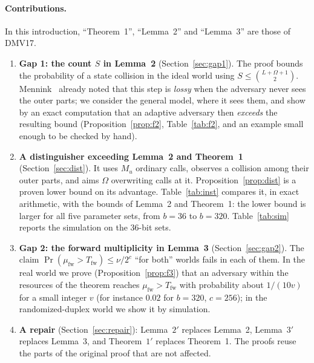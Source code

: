 \documentclass[11pt,a4paper]{article}
\theoremstyle{definition}
\theoremstyle{remark}
\newcommand{\mufw}{\mu_{\mathrm{fw}}}
\newcommand{\Tfw}{T_{\mathrm{fw}}}
\begin{document}
\paragraph{Contributions.}
In this introduction, ``Theorem~1'', ``Lemma~2'' and ``Lemma~3'' are those of DMV17.
\begin{enumerate}[leftmargin=*,itemsep=2pt]
\item \textbf{Gap 1: the count $S$ in Lemma~2} (Section~\ref{sec:gap1}). The proof bounds the probability of a state
collision in the ideal world using $S \le \binom{L+\Omega+1}{2}$. Mennink~\cite[Section~8.3]{Men23} already noted that this
step is \emph{lossy} when the adversary never sees the outer parts; we consider the general model, where it sees them,
and show by an exact computation that an adaptive adversary then \emph{exceeds} the resulting bound (Proposition~\ref{prop:f2}, Table~\ref{tab:f2}, and an example small enough
to be checked by hand).
\item \textbf{A distinguisher exceeding Lemma~2 and Theorem~1} (Section~\ref{sec:dist}). It uses $M_u$ ordinary
calls, observes a collision among their outer parts, and aims $\Omega$ overwriting calls at it. Proposition~\ref{prop:dist}
is a proven lower bound on its advantage. Table~\ref{tab:inst} compares it, in exact arithmetic, with the bounds of
Lemma~2 and Theorem~1: the lower bound is larger for all five parameter sets, from $b = 36$ to $b = 320$.
Table~\ref{tab:sim} reports the simulation on the $36$-bit sets.
\item \textbf{Gap 2: the forward multiplicity in Lemma~3} (Section~\ref{sec:gap2}). The claim
$\Pr(\mufw > \Tfw) \le \nu/2^c$ ``for both'' worlds fails in each of them. In the real world we prove
(Proposition~\ref{prop:f3}) that an adversary within the resources of the theorem reaches $\mufw > \Tfw$ with
probability about $1/(10v)$ for a small integer $v$ (for instance $0.02$ for $b = 320$, $c = 256$); in the randomized-duplex world we show it by simulation.
\item \textbf{A repair} (Section~\ref{sec:repair}): Lemma~$2'$ replaces Lemma~2, Lemma~$3'$
replaces Lemma~3, and Theorem~$1'$ replaces Theorem~1. The proofs reuse the parts of the original
proof that are not affected.
\end{enumerate}
\end{document}
